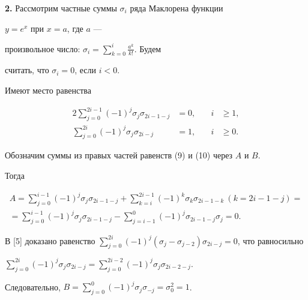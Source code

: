  


 


{\bf 2.} Рассмотрим частные суммы $\sigma_i$ ряда Маклорена функции 


$y=e^x$ при $x=a$, где $a$ --- 


произвольное число: $\sigma_i=\sum\limits^i_{k=0}\frac{a^k}{k!}$. Будем 


считать, что $\sigma_i=0$, если $i<0$. 


 


\begin{lem} 


Имеют место равенства 


\begin{alignat}{2} 


\sum^{2i-1}_{j=0}(-1)^j\sigma_j\sigma_{2i-1-j}&=0, &\quad i&\ge 1, \\ 


\sum^{2i}_{j=0}(-1)^j\sigma_j\sigma_{2i-j}&=1, &\quad i&\ge 0. 


\end{alignat} 


\end{lem} 


 


\begin{pf} 


Обозначим суммы из правых частей равенств (9) и (10) через $A$ и $B$. 


Тогда 


\begin{multline*} 


A=\sum^{i-1}_{j=0}(-1)^j\sigma_j\sigma_{2i-1-j} 


+\sum^{2i-1}_{k=i}(-1)^k\sigma_k\sigma_{2i-1-k}\ (k=2i-1-j)= \\ 


% 


=\sum^{i-1}_{j=0}(-1)^j\sigma_j\sigma_{2i-1-j}- 


\sum^0_{j=i-1}(-1)^j\sigma_{2i-1-j}\sigma_j=0. 


\end{multline*} 


В [5] доказано равенство $\sum\limits^{2i}_{j=0}(-1)^j 


(\sigma_j-\sigma_{j-2})\sigma_{2i-j}=0$, что равносильно 


$\sum\limits^{2i}_{j=0}(-1)^j\sigma_j\sigma_{2i-j}= 


\sum\limits^{2i-2}_{j=0}(-1)^j\sigma_j\sigma_{2i-2-j}$. 


Следовательно, $B=\sum\limits^0_{j=0}(-1)^j\sigma_j\sigma_{-j}= 


\sigma^2_0=1$. 


\end{pf} 


